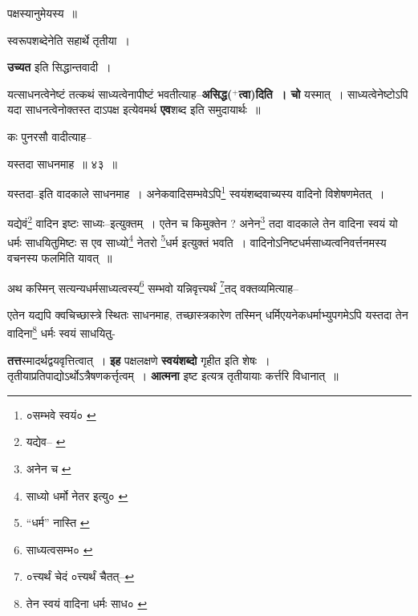 \documentclass[article,12pt,a4paper]{memoir}
\newcommand{\add}[1]{($^{+}$#1)}
\begin{document}
	  \endgroup
	

	  \pstart पक्षस्यानुमेयस्य ॥
	\pend
      

	  \pstart स्वरूपशब्देनेति सहार्थे तृतीया ।
	\pend
      

	  \pstart \leavevmode{} \textbf{उच्यत} इति सिद्धान्तवादी ।
	\pend
      

	  \pstart यत्साधनत्वेनेष्टं तत्कथं साध्यत्वेनापीष्टं भवतीत्याह--\textbf{असिद्ध\add{त्वा}दिति । चो} यस्मात् । साध्यत्वेनेष्टोऽपि यदा साधनत्वेनोक्तस्त दाऽपक्ष इत्येवमर्थ \textbf{एव}शब्द इति समुदायार्थः ॥
	\pend
      \leavevmode{}
	  \bigskip
	  \begingroup
	

	  \pstart कः पुनरसौ वादीत्याह--
	\pend
       
	  \bigskip
	  \begingroup
	

	  \pstart यस्तदा साधनमाह ॥ ४३ ॥
	\pend
      
	  \endgroup
	 

	  \pstart यस्तदा--इति वादकाले साधनमाह । अनेकवादिसम्भवेऽपि\footnote{०सम्भवे स्वयं० \cite{dp-msB} \cite{dp-msC} \cite{dp-msD}} स्वयंशब्दवाच्यस्य वादिनो विशेषणमेतत् ।
	\pend
       

	  \pstart यद्येवं\footnote{यद्येव--\cite{dp-msA} \cite{dp-msB} \cite{dp-edP} \cite{dp-edH}} वादिन इष्टः साध्यः--इत्युक्तम् । एतेन च किमुक्तेन ? अनेन\footnote{अनेन च \cite{dp-msC}} तदा वादकाले तेन वादिना स्वयं यो धर्मः साधयितुमिष्टः स एव साध्यो\footnote{साध्यो धर्मो नेतर इत्यु० \cite{dp-msC}} नेतरो \footnote{“धर्म” नास्ति \cite{dp-msB}}धर्म इत्युक्तं भवति । वादिनोऽनिष्टधर्मसाध्यत्वनिवर्त्तनमस्य वचनस्य फलमिति यावत् ॥
	\pend
       

	  \pstart अथ कस्मिन् सत्यन्यधर्मसाध्यत्वस्य\footnote{साध्यत्वसम्भ० \cite{dp-msA} \cite{dp-msC} \cite{dp-edP} \cite{dp-edH} \cite{dp-edE}} सम्भवो यन्निवृत्त्यर्थं \footnote{०त्त्यर्थं चेदं \cite{dp-msA} \cite{dp-msD} \cite{dp-edP} \cite{dp-edH} \cite{dp-edE} \cite{dp-edN} ०त्त्यर्थं चैतत्--\cite{dp-msB}}तद् वक्तव्यमित्याह--
	\pend
       
	  \bigskip
	  \begingroup
	

	  \pstart एतेन यद्यपि क्वचिच्छास्त्रे स्थितः साधनमाह, तच्छास्त्रकारेण तस्मिन् धर्मिएयनेकधर्माभ्युपगमेऽपि यस्तदा तेन वादिना\footnote{तेन स्वयं वादिना धर्मः साध० \cite{dp-msC}} धर्मः स्वयं साधयितु-
	\pend
      
	  \endgroup
	
	  \endgroup
	

	  \pstart \textbf{तत्त}स्मादर्थद्वयवृत्तित्वात् । \textbf{इह} पक्षलक्षणे \textbf{स्वयंशब्दो} गृहीत इति शेषः । तृतीयाप्रतिपाद्योऽर्थोऽत्रैषणकर्त्तृत्वम् । \textbf{आत्मना} इष्ट इत्यत्र तृतीयायाः कर्त्तरि विधानात् ॥
	\pend
      
\end{document}
